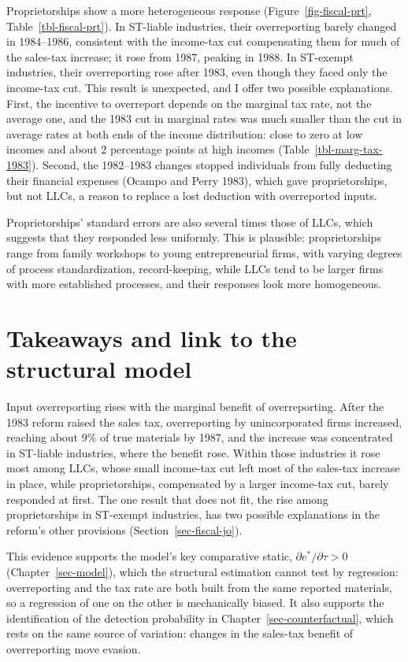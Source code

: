 \documentclass[
  12pt,
  letterpaper,
  oneside,
  openany]{report}
\begin{document}
Proprietorships show a more heterogeneous response
(Figure~\ref{fig-fiscal-prt}, Table~\ref{tbl-fiscal-prt}). In ST-liable
industries, their overreporting barely changed in 1984--1986, consistent
with the income-tax cut compensating them for much of the sales-tax
increase; it rose from 1987, peaking in 1988. In ST-exempt industries,
their overreporting rose after 1983, even though they faced only the
income-tax cut. This result is unexpected, and I offer two possible
explanations. First, the incentive to overreport depends on the marginal
tax rate, not the average one, and the 1983 cut in marginal rates was
much smaller than the cut in average rates at both ends of the income
distribution: close to zero at low incomes and about 2 percentage points
at high incomes (Table~\ref{tbl-marg-tax-1983}). Second, the 1982--1983
changes stopped individuals from fully deducting their financial
expenses (Ocampo and Perry 1983), which gave proprietorships, but not
LLCs, a reason to replace a lost deduction with overreported inputs.

Proprietorships' standard errors are also several times those of LLCs,
which suggests that they responded less uniformly. This is plausible:
proprietorships range from family workshops to young entrepreneurial
firms, with varying degrees of process standardization, record-keeping,
while LLCs tend to be larger firms with more established processes, and
their responses look more homogeneous.

\section{Takeaways and link to the structural
model}\label{sec-fiscal-takeaways}

Input overreporting rises with the marginal benefit of overreporting.
After the 1983 reform raised the sales tax, overreporting by
unincorporated firms increased, reaching about 9\% of true materials by
1987, and the increase was concentrated in ST-liable industries, where
the benefit rose. Within those industries it rose most among LLCs, whose
small income-tax cut left most of the sales-tax increase in place, while
proprietorships, compensated by a larger income-tax cut, barely
responded at first. The one result that does not fit, the rise among
proprietorships in ST-exempt industries, has two possible explanations
in the reform's other provisions (Section~\ref{sec-fiscal-jo}).

This evidence supports the model's key comparative static,
\(\partial e^*/\partial\tau>0\) (Chapter~\ref{sec-model}), which the
structural estimation cannot test by regression: overreporting and the
tax rate are both built from the same reported materials, so a
regression of one on the other is mechanically biased. It also supports
the identification of the detection probability in
Chapter~\ref{sec-counterfactual}, which rests on the same source of
variation: changes in the sales-tax benefit of overreporting move
evasion.
\end{document}
